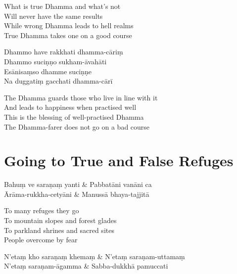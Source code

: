 \begin{english}
  What is true Dhamma and what's not\\
  Will never have the same results\\
  While wrong Dhamma leads to hell realms\\
  True Dhamma takes one on a good course
\end{english}

\begin{paritta}
  Dhammo have rakkhati dhamma-cāriṃ\\
  Dhammo suciṇṇo sukham-āvahāti\\
  Esānisaṃso dhamme suciṇṇe\\
  Na duggatiṃ gacchati dhamma-cārī
\end{paritta}

\clearpage

\begin{english}
  The Dhamma guards those who live in line with it\\
  And leads to happiness when practised well\\
  This is the blessing of well-practised Dhamma\\
  The Dhamma-farer does not go on a bad course
\end{english}


\clearpage

\section{Going to True and False Refuges}

\begin{twochants}
  Bahuṃ ve saraṇaṃ yanti & Pabbatāni vanāni ca\\
  Ārāma-rukkha-cetyāni & Manussā bhaya-tajjitā\\
\end{twochants}

\begin{english}
  To many refuges they go\\
  To mountain slopes and forest glades\\
  To parkland shrines and sacred sites\\
  People overcome by fear
\end{english}

\begin{twochants}
  N'etaṃ kho saraṇaṃ khemaṃ & N'etaṃ saraṇam-uttamaṃ\\
  N'etaṃ saraṇam-āgamma & Sabba-dukkhā pamuccati\\
\end{twochants}

